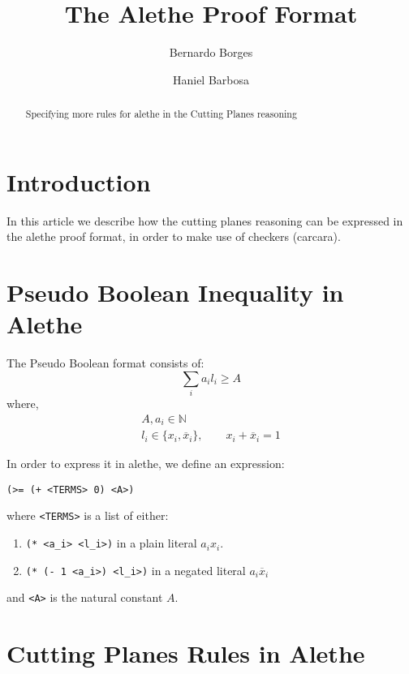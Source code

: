 \documentclass[12pt]{article}
\title{\textbf{The Alethe Proof Format}}
\author{Bernardo Borges \and Haniel Barbosa}
\newcommand{\code}[1]{\colorbox{light-gray}{\texttt{#1}}}
\begin{document}
\maketitle

\begin{abstract}
    Specifying more rules for alethe in the Cutting Planes reasoning
\end{abstract}

\tableofcontents

\section{Introduction}
In this article we describe how the cutting planes reasoning can be expressed in the alethe
proof format, in order to make use of checkers (carcara).

\section{Pseudo Boolean Inequality in Alethe}
The Pseudo Boolean format consists of:
\begin{equation}
    \sum_i{a_i l_i} \ge A
\end{equation}
where,
\begin{equation}
    \begin{gathered}
        A, a_i \in \mathbb{N} \\
        l_i \in \{ x_i, \overline x_i \}, \qquad x_i + \overline x_i = 1
    \end{gathered}
\end{equation}

In order to express it in alethe, we define an expression:

\centerline{\code{(>= (+ <TERMS> 0) <A>)}}

where \code{<TERMS>} is a list of either:
\begin{enumerate}
    \item \code{(* <a\_i> <l\_i>)} in a plain literal $a_i x_i$.
    \item \code{(* (- 1 <a\_i>) <l\_i>)} in a negated literal $a_i \overline x_i$
\end{enumerate}

and \code{<A>} is the natural constant $A$.

\section{Cutting Planes Rules in Alethe}
\end{document}
